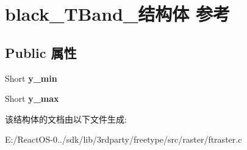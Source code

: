 \hypertarget{structblack___t_band__}{}\section{black\+\_\+\+T\+Band\+\_\+结构体 参考}
\label{structblack___t_band__}
\subsection*{Public 属性}
\begin{DoxyCompactItemize}
\item 
\mbox{\label{structblack___t_band___a694ff5296ee30dacec40851d4485b3e6}} 
Short {\bfseries y\+\_\+min}
\item 
\mbox{\label{structblack___t_band___a2182cdc2dbff5d5bcd4e15497c72e792}} 
Short {\bfseries y\+\_\+max}
\end{DoxyCompactItemize}


该结构体的文档由以下文件生成\+:\begin{DoxyCompactItemize}
\item 
E\+:/\+React\+O\+S-\/0../sdk/lib/3rdparty/freetype/src/raster/ftraster.\+c\end{DoxyCompactItemize}
